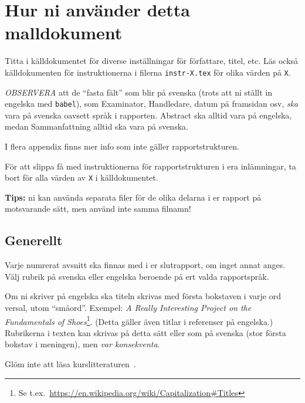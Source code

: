 \section*{Hur ni använder detta malldokument}
Titta i källdokumentet för diverse inställningar för författare, titel, etc. Läs också käll\-doku\-men\-ten för instruktionerna i filerna \verb|instr-X.tex| för olika värden på \verb|X|.

\emph{OBSERVERA} att de ``fasta fält'' som blir på svenska (trots att ni ställt in engelska med \texttt{babel}), som Examinator, Handledare, datum på framsidan osv, \emph{ska} vara på svenska oavsett språk i rapporten. Abstract ska alltid vara på engelska, medan Sammanfattning alltid ska vara på svenska.

I flera appendix finns mer info som inte gäller rapportstrukturen.

För att slippa få med instruktionerna för rapportstrukturen i era inlämningar, ta bort \verb|| för alla värden av \verb|X|
i källdokumentet.

\textbf{Tips:} ni kan använda separata filer för de olika delarna i er rapport på motsvarande sätt, men använd inte samma filnamn!

\subsection*{Generellt}
Varje numrerat avsnitt ska finnas med i er slutrapport, om inget annat anges.  
Välj rubrik på svenska eller engelska beroende på ert valda rapportspråk.

Om ni skriver på engelska ska titeln skrivas med första bokstaven i varje ord versal, utom ``småord''. Exempel: \emph{A Really Interesting Project on the Fundamentals of Shoes}\footnote{Se t.ex.~\url{https://en.wikipedia.org/wiki/Capitalization\#Titles}}.  (Detta gäller även titlar i referenser på engelska.)
Rubrikerna i texten kan skrivas på detta sätt eller som på svenska (stor första bokstav i meningen), men \emph{var konsekventa}.

Glöm inte att läsa kurslitteraturen~\cite{dawson:projects-in-computing,dawson:projects-in-computing-old}.


